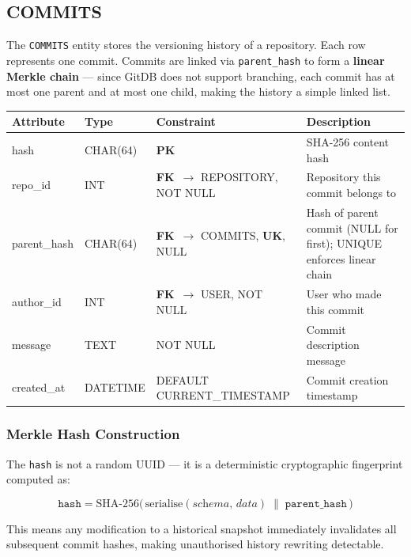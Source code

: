 \documentclass[12pt, a4paper]{article}
\newcommand{\pk}{\textbf{\textcolor{sectioncolor}{PK}}}
\newcommand{\fk}{\textbf{\textcolor{red!70!black}{FK}}}
\newcommand{\uk}{\textbf{\textcolor{green!50!black}{UK}}}
\begin{document}
\subsection{COMMITS}

The \texttt{COMMITS} entity stores the versioning history of a repository. Each
row represents one commit. Commits are linked via \texttt{parent\_hash} to form
a \textbf{linear Merkle chain} --- since GitDB does not support branching,
each commit has at most one parent and at most one child, making the history
a simple linked list.

\begin{center}
\begin{tabular}{>{\ttfamily}l >{\ttfamily}l l l}
\toprule
\textbf{Attribute} & \textbf{Type} & \textbf{Constraint} & \textbf{Description} \\
\midrule
hash         & CHAR(64)     & \pk                           & SHA-256 content hash \\
repo\_id     & INT          & \fk\ $\to$ REPOSITORY, NOT NULL & Repository this commit belongs to \\
parent\_hash & CHAR(64)     & \fk\ $\to$ COMMITS, \uk, NULL & Hash of parent commit (NULL for first); UNIQUE enforces linear chain \\
author\_id   & INT          & \fk\ $\to$ USER, NOT NULL     & User who made this commit \\
message      & TEXT         & NOT NULL                      & Commit description message \\
created\_at  & DATETIME     & DEFAULT CURRENT\_TIMESTAMP   & Commit creation timestamp \\
\bottomrule
\end{tabular}
\end{center}

\subsubsection*{Merkle Hash Construction}

The \texttt{hash} is not a random UUID --- it is a deterministic cryptographic
fingerprint computed as:

\[
\texttt{hash} = \text{SHA-256}\bigl(\,\text{serialise}(\textit{schema},\,
\textit{data})\;\|\;\texttt{parent\_hash}\,\bigr)
\]

This means any modification to a historical snapshot immediately invalidates
all subsequent commit hashes, making unauthorised history rewriting detectable.
\end{document}

